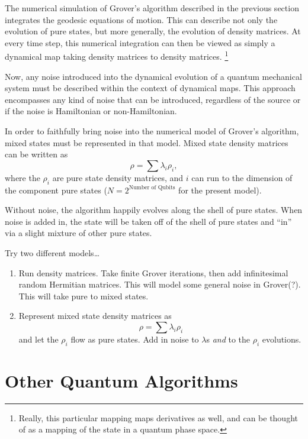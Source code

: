 The numerical simulation of Grover's algorithm described 
in the previous section integrates the geodesic equations 
of motion.  This can describe not only the evolution of pure states, 
but more generally, the evolution of density matrices.  
At every time step,
this numerical integration can then be viewed as simply a dynamical
map taking density matrices to density matrices.
\footnote{Really, this particular mapping maps derivatives as well, and
can be thought of as a mapping of the state in a quantum phase 
space.}

Now, any noise introduced into the dynamical evolution of a 
quantum mechanical system must be described within the context 
of dynamical maps.   This approach encompasses any kind of noise
that can be introduced, regardless of the source or if the noise
is Hamiltonian or non-Hamiltonian.

In order to faithfully bring noise into the numerical model of Grover's 
algorithm, mixed states must be represented in that model.  
Mixed state density matrices can be written as
\begin{equation}
\rho = \sum\lambda_i\rho_i,
\end{equation}
where the $\rho_i$ are pure state density matrices, and $i$ can run 
to the dimension of the component pure 
states ($N=2^{\text{Number of Qubits}}$ for the present model). 

Without noise,
the algorithm happily evolves along the shell of pure states.
When noise is added in, the state will be taken off of the shell 
of pure states and ``in'' via a slight mixture of other pure states.

Try two different models\dots
\begin{enumerate}
\item Run density matrices.  Take finite Grover iterations, then add
infinitesimal random Hermitian matrices.  This will model some general
noise in Grover(?). This will take pure to mixed states.
\item Represent mixed state density matrices as
\begin{equation}
\rho = \sum\lambda_i\rho_i
\end{equation}
and let the $\rho_i$ flow as pure states.  Add in noise to $\lambda$s
{\sl and} to the $\rho_i$ evolutions.
\end{enumerate}


\section{Other Quantum Algorithms}

